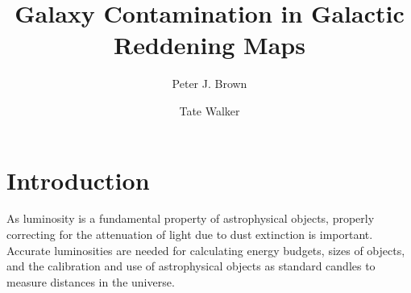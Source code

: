 \documentclass[twocolumn]{aastex61}
\begin{document}
\title{Galaxy Contamination in Galactic Reddening Maps}





\author[0000-0001-6272-5507]{Peter J. Brown}


\author{Tate Walker}


\begin{abstract}


\end{abstract}



\section{Introduction} \label{sec:intro}

As luminosity is a fundamental property of astrophysical objects, properly correcting for the attenuation of light due to dust extinction is important.  Accurate luminosities are needed for calculating energy budgets, sizes of objects, and the calibration and use of astrophysical objects as standard candles to measure distances in the universe.
\end{document}
